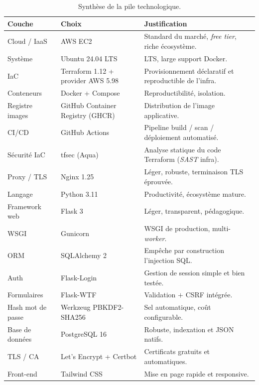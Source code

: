 \begin{table}[H]
\centering
\caption{Synthèse de la pile technologique.}
\begin{tabular}{P{3.5cm} P{4cm} P{6.5cm}}
\toprule
\textbf{Couche} & \textbf{Choix} & \textbf{Justification} \\
\midrule
Cloud / IaaS    & AWS EC2          & Standard du marché, \emph{free tier}, riche écosystème. \\
Système         & Ubuntu 24.04 LTS & LTS, large support Docker. \\
IaC             & Terraform 1.12 + provider AWS 5.98 & Provisionnement déclaratif et reproductible de l'infra. \\
Conteneurs      & Docker + Compose & Reproductibilité, isolation. \\
Registre images & GitHub Container Registry (GHCR) & Distribution de l'image applicative. \\
CI/CD           & GitHub Actions   & Pipeline build / scan / déploiement automatisé. \\
Sécurité IaC    & tfsec (Aqua)     & Analyse statique du code Terraform (\textit{SAST} infra). \\
Proxy / TLS     & Nginx 1.25       & Léger, robuste, terminaison TLS éprouvée. \\
Langage         & Python 3.11      & Productivité, écosystème mature. \\
Framework web   & Flask 3          & Léger, transparent, pédagogique. \\
WSGI            & Gunicorn         & WSGI de production, multi-\emph{worker}. \\
ORM             & SQLAlchemy 2     & Empêche par construction l'injection SQL. \\
Auth            & Flask-Login      & Gestion de session simple et bien testée. \\
Formulaires     & Flask-WTF        & Validation \(+\) CSRF intégrée. \\
Hash mot de passe & Werkzeug PBKDF2-SHA256 & Sel automatique, coût configurable. \\
Base de données & PostgreSQL 16    & Robuste, indexation et JSON natifs. \\
TLS / CA        & Let's Encrypt + Certbot & Certificats gratuits et automatiques. \\
Front-end       & Tailwind CSS     & Mise en page rapide et responsive. \\
\bottomrule
\end{tabular}
\end{table}

